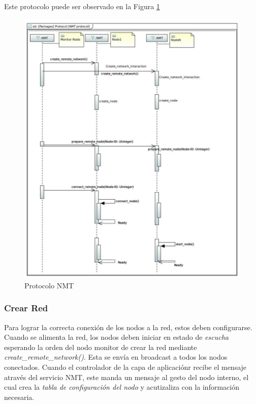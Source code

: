 Este protocolo puede ser observado en la Figura \ref{fig:ProtocolNMTConnectNet}
\begin{figure}[h!]
 \centering
 \includegraphics[scale=0.4]{images/Secciones/AppendixA/Protocol_NMT.JPG}
  \caption{Protocolo NMT}
  \label{fig:ProtocolNMTConnectNet}
\end{figure} 

\subsubsection{Crear Red}\label{NMT:crear_red}
Para lograr la correcta conexión de los nodos a la red, estos deben
configurarse. Cuando se alimenta la red, los nodos deben iniciar en estado de
\textit{escucha} esperando la orden del nodo monitor de crear la red mediante
\textit{create\_remote\_network()}. Esta se envía en broadcast a todos los nodos
conectados. Cuando el controlador de la capa de aplicaciónr recibe el mensaje
através del servicio NMT, este manda un mensaje al gesto del nodo interno, el
cual crea la \textit{tabla de configuración del nodo} y acutizaliza con la
información necesaria.

